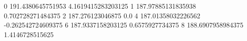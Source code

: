0 191.4380645751953 4.1619415283203125
1 187.97885131835938 0.702728271484375
2 187.276123046875 0.0
4 187.01358032226562 -0.262542724609375
6 187.9337158203125 0.6575927734375
8 188.6907958984375 1.4146728515625
